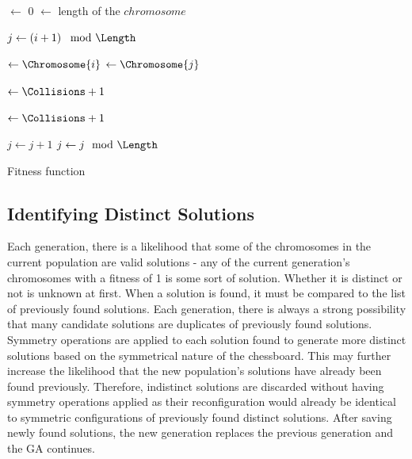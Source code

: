 \documentclass[conference]{IEEEtran}
\begin{document}
\begin{algorithm}[t!]
  \SetAlgoLined
  \DontPrintSemicolon
  
  {
    \BlankLine
    
    \Collisions $\leftarrow$ 0\;
    \Length $\leftarrow$ length of the $chromosome$\;
    \BlankLine
    
    {
      $j \leftarrow \left( i + 1 \right) \mod{\Length}$\;
      {
        \Yi $\leftarrow \Chromosome{i}$\;
        \Yj $\leftarrow \Chromosome{j}$\;
        \BlankLine
        
        \If{\Yi == \Yj}
        {
          \Collisions $\leftarrow \Collisions + 1$\; 
        }
        \BlankLine
        
        {
          \Collisions $\leftarrow \Collisions + 1$\;
        }
        \BlankLine
        
        $j \leftarrow j + 1$\;
        $j \leftarrow j \mod{\Length}$\;
      }
    }
    \BlankLine

    {
      \;
    }
    {
      \;
    }
  }
\caption{Fitness function}
\label{alg:fitness}
\end{algorithm}

\subsection{Identifying Distinct Solutions}
Each generation, there is a likelihood that some of the chromosomes in the current population are valid solutions - any of the current generation's chromosomes with a fitness of 1 is some sort of solution. Whether it is distinct or not is unknown at first. When a solution is found, it must be compared to the list of previously found solutions. Each generation, there is always a strong possibility that many candidate solutions are duplicates of previously found solutions. Symmetry operations are applied to each solution found to generate more distinct solutions based on the symmetrical nature of the chessboard. This may further increase the likelihood that the new population's solutions have already been found previously. Therefore, indistinct solutions are discarded without having symmetry operations applied as their reconfiguration would already be identical to symmetric configurations of previously found distinct solutions. After saving newly found solutions, the new generation replaces the previous generation and the GA continues.
\end{document}
